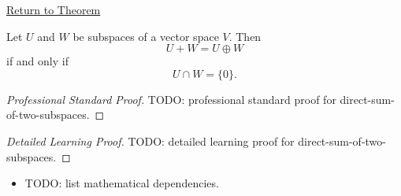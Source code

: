 \newpage
{}
\label{prf:direct-sum-of-two-subspaces}

\begin{remark*}[Return]
\hyperref[thm:direct-sum-of-two-subspaces]{Return to Theorem}
\end{remark*}

\begin{theorem*}
Let $U$ and $W$ be subspaces of a vector space $V$.
Then
\[
U+W=U\oplus W
\]
if and only if
\[
U \cap W = \{0\}.
\]
\end{theorem*}

\begin{proof}[Professional Standard Proof]
\LRAProofBodyStart
TODO: professional standard proof for direct-sum-of-two-subspaces.
\end{proof}

\begin{proof}[Detailed Learning Proof]
\LRAProofBodyStart
TODO: detailed learning proof for direct-sum-of-two-subspaces.
\end{proof}

\begin{remark*}
\end{remark*}

\begin{dependencies}
\begin{itemize}
  \item TODO: list mathematical dependencies.
\end{itemize}
\end{dependencies}

\clearpage
